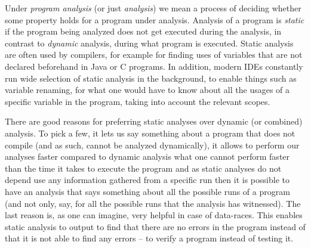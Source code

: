 \documentclass[..thesis.tex]{subfiles}
\begin{document}



Under \textit{program analysis} (or just \textit{analysis}) we mean a process of deciding whether some property holds for a program under analysis.
Analysis of a program is \textit{static} if the program being analyzed does not get executed during the analysis, in contrast to \textit{dynamic} analysis,
during what program is executed. Static analysis are often used by compilers, for example for finding uses of variables that are not declared beforehand
in Java or C programs. In addition, modern IDEs constantly run wide selection of static analysis in the background, to enable things such as variable renaming,
for what one would have to know about all the usages of a specific variable in the program, taking into account the relevant scopes. 



There are good reasons for preferring static analyses over dynamic (or combined) analysis.
To pick a few, it lets us say something about a program that does not compile (and as such, cannot be analyzed dynamically),
it allows to perform our analyses faster compared to dynamic analysis what one cannot perform faster than the time it takes to execute the program
and as static analyses do not depend use any information gathered from a specific run then it is possible to have an analysis that says something
about all the possible runs of a program (and not only, say, for all the possible runs that the analysis has witnessed).
The last reason is, as one can imagine, very helpful in case of data-races. This enables static analysis to output to find that there
 are no errors in the program instead of that it is not able to find any errors -- to verify a program instead of testing it.
\end{document}
